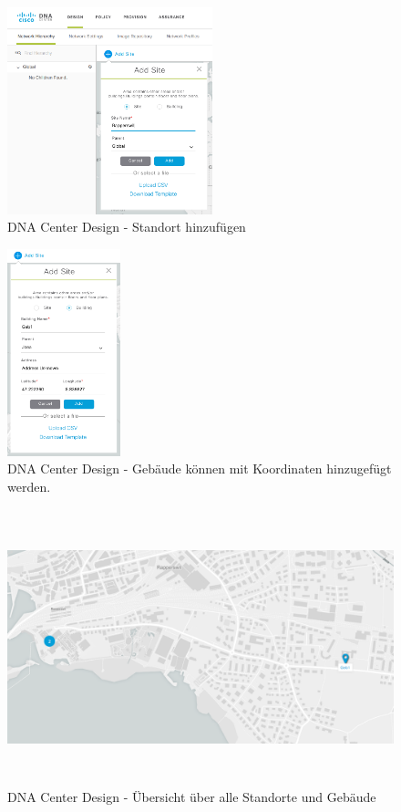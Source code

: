 \begin{figure}[H]
	\centering
	\includegraphics[height=6cm]{img/Selection_012.png}
	\caption{DNA Center Design - Standort hinzufügen}
	\label{fig:dna-center-design-2}
\end{figure}

\begin{figure}[H]
	\centering
	\includegraphics[height=6cm]{img/Selection_014.png}
	\caption{DNA Center Design - Gebäude können mit Koordinaten hinzugefügt werden.}
	\label{fig:dna-center-design-3}
\end{figure}

\begin{figure}[H]
	\centering
	\includegraphics[height=8cm]{img/design_map_overview.PNG}
	\caption{DNA Center Design - Übersicht über alle Standorte und Gebäude}
	\label{fig:dna-center-design-overview}
\end{figure}

